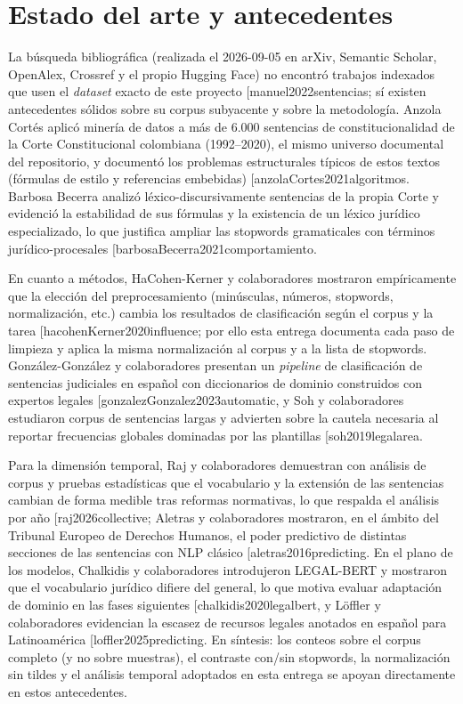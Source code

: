 \documentclass[11pt]{tg_usta}
\makeatletter
\renewcommand{\cite}{\@ifnextchar[{\@tempswatrue\@citex}{\@tempswafalse\@citex[]}}
\makeatother
\begin{document}
\section{Estado del arte y antecedentes}
La búsqueda bibliográfica (realizada el 2026-09-05 en arXiv, Semantic Scholar, OpenAlex, Crossref y el propio Hugging Face) no encontró trabajos indexados que usen el \emph{dataset} exacto de este proyecto \cite{manuel2022sentencias}; sí existen antecedentes sólidos sobre su corpus subyacente y sobre la metodología. Anzola Cortés aplicó minería de datos a más de 6.000 sentencias de constitucionalidad de la Corte Constitucional colombiana (1992--2020), el mismo universo documental del repositorio, y documentó los problemas estructurales típicos de estos textos (fórmulas de estilo y referencias embebidas) \cite{anzolaCortes2021algoritmos}. Barbosa Becerra analizó léxico-discursivamente sentencias de la propia Corte y evidenció la estabilidad de sus fórmulas y la existencia de un léxico jurídico especializado, lo que justifica ampliar las stopwords gramaticales con términos jurídico-procesales \cite{barbosaBecerra2021comportamiento}.

En cuanto a métodos, HaCohen-Kerner y colaboradores mostraron empíricamente que la elección del preprocesamiento (minúsculas, números, stopwords, normalización, etc.) cambia los resultados de clasificación según el corpus y la tarea \cite{hacohenKerner2020influence}; por ello esta entrega documenta cada paso de limpieza y aplica la misma normalización al corpus y a la lista de stopwords. González-González y colaboradores presentan un \emph{pipeline} de clasificación de sentencias judiciales en español con diccionarios de dominio construidos con expertos legales \cite{gonzalezGonzalez2023automatic}, y Soh y colaboradores estudiaron corpus de sentencias largas y advierten sobre la cautela necesaria al reportar frecuencias globales dominadas por las plantillas \cite{soh2019legalarea}.

Para la dimensión temporal, Raj y colaboradores demuestran con análisis de corpus y pruebas estadísticas que el vocabulario y la extensión de las sentencias cambian de forma medible tras reformas normativas, lo que respalda el análisis por año \cite{raj2026collective}; Aletras y colaboradores mostraron, en el ámbito del Tribunal Europeo de Derechos Humanos, el poder predictivo de distintas secciones de las sentencias con NLP clásico \cite{aletras2016predicting}. En el plano de los modelos, Chalkidis y colaboradores introdujeron LEGAL-BERT y mostraron que el vocabulario jurídico difiere del general, lo que motiva evaluar adaptación de dominio en las fases siguientes \cite{chalkidis2020legalbert}, y Löffler y colaboradores evidencian la escasez de recursos legales anotados en español para Latinoamérica \cite{loffler2025predicting}. En síntesis: los conteos sobre el corpus completo (y no sobre muestras), el contraste con/sin stopwords, la normalización sin tildes y el análisis temporal adoptados en esta entrega se apoyan directamente en estos antecedentes.
\end{document}
